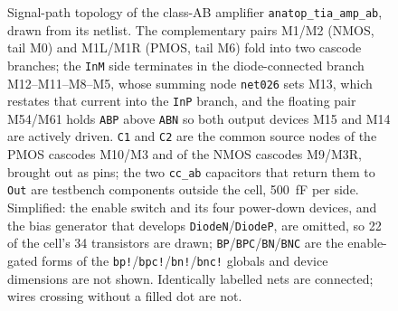\begin{figure}[htbp]
{\begin{circuitikz}
\end{circuitikz}
  }
  \caption[{Signal-path topology of the class-AB amplifier \texttt{anatop\_tia\_amp\_ab}.}]{Signal-path topology of the class-AB amplifier \texttt{anatop\_tia\_amp\_ab}, drawn from its netlist. The complementary pairs M1/M2 (NMOS, tail M0) and M1L/M1R (PMOS, tail M6) fold into two cascode branches; the \texttt{InM} side terminates in the diode-connected branch M12--M11--M8--M5, whose summing node \texttt{net026} sets M13, which restates that current into the \texttt{InP} branch, and the floating pair M54/M61 holds \texttt{ABP} above \texttt{ABN} so both output devices M15 and M14 are actively driven. \texttt{C1} and \texttt{C2} are the common source nodes of the PMOS cascodes M10/M3 and of the NMOS cascodes M9/M3R, brought out as pins; the two \texttt{cc\_ab} capacitors that return them to \texttt{Out} are testbench components outside the cell, \SI{500}{\femto\farad} per side. Simplified: the enable switch and its four power-down devices, and the bias generator that develops \texttt{DiodeN}/\texttt{DiodeP}, are omitted, so 22 of the cell's 34 transistors are drawn; \texttt{BP}/\texttt{BPC}/\texttt{BN}/\texttt{BNC} are the enable-gated forms of the \texttt{bp!}/\texttt{bpc!}/\texttt{bn!}/\texttt{bnc!} globals and device dimensions are not shown. Identically labelled nets are connected; wires crossing without a filled dot are not.}
  \label{fig:tiaampab-topology}
\end{figure}
